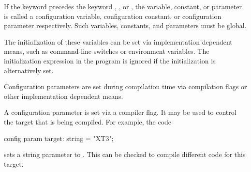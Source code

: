 If the keyword  precedes the
keyword , , or , the variable,
constant, or parameter is called a configuration variable,
configuration constant, or configuration parameter respectively.  Such
variables, constants, and parameters must be global.

The initialization of these variables can be set via implementation
dependent means, such as command-line switches or environment
variables.  The initialization expression in the program is ignored if
the initialization is alternatively set.

Configuration parameters are set during compilation time via
compilation flags or other implementation dependent means.
\begin{example}
A configuration parameter is set via a compiler flag.  It may be used
to control the target that is being compiled.  For example, the code
\begin{chapel}
config param target: string = "XT3";
\end{chapel}
sets a string parameter  to .  This can be
checked to compile different code for this target.
\end{example}
